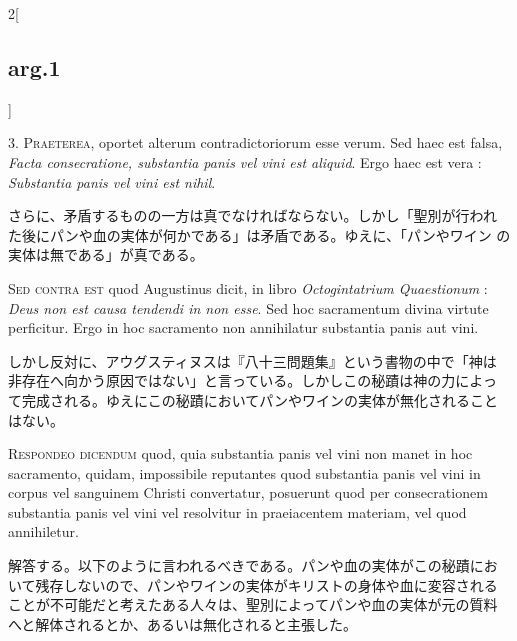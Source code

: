 \documentclass[paper=a4paper,fontsize=10pt,jafontsize=9pt,titlepage]{jlreq}
\begin{document}
\begin{paracol}{2}[\subsection{arg.1}]

3. {\scshape Praeterea}, oportet alterum contradictoriorum esse
verum. Sed haec est falsa, {\itshape Facta consecratione, substantia
panis vel vini est aliquid}. Ergo haec est vera : {\itshape Substantia
panis vel vini est nihil}.

\switchcolumn

さらに、矛盾するものの一方は真でなければならない。しかし「聖別が行われ
た後にパンや血の実体が何かである」は矛盾である。ゆえに、「パンやワイン
の実体は無である」が真である。

\switchcolumn*[\subsection{s.c.}]

{\scshape Sed contra est} quod Augustinus dicit, in libro {\itshape
Octogintatrium Quaestionum} : {\itshape Deus non est causa tendendi in
non esse}. Sed hoc sacramentum divina virtute perficitur. Ergo in hoc
sacramento non annihilatur substantia panis aut vini.

\switchcolumn

しかし反対に、アウグスティヌスは『八十三問題集』という書物の中で「神は
非存在へ向かう原因ではない」と言っている。しかしこの秘蹟は神の力によっ
て完成される。ゆえにこの秘蹟においてパンやワインの実体が無化されること
はない。


{\scshape Respondeo dicendum} quod, quia substantia panis vel vini non
manet in hoc sacramento, quidam, impossibile reputantes quod
substantia panis vel vini in corpus vel sanguinem Christi convertatur,
posuerunt quod per consecrationem substantia panis vel vini vel
resolvitur in praeiacentem materiam, vel quod annihiletur.

\switchcolumn

解答する。以下のように言われるべきである。パンや血の実体がこの秘蹟にお
いて残存しないので、パンやワインの実体がキリストの身体や血に変容される
ことが不可能だと考えたある人々は、聖別によってパンや血の実体が元の質料
へと解体されるとか、あるいは無化されると主張した。

\switchcolumn*


\end{paracol}
\end{document}
